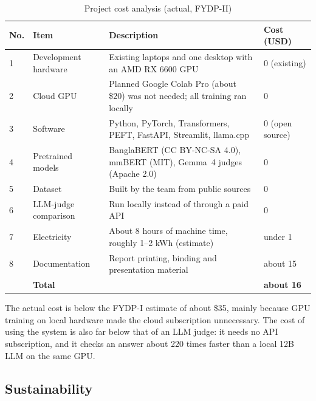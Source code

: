 \begin{table}[htbp]
\centering
\small
\caption{Project cost analysis (actual, FYDP-II)}
\label{tab:cost}
\begin{tabular}{p{0.4cm}p{3.2cm}p{5.6cm}p{2.2cm}}
\hline
\textbf{No.} & \textbf{Item} & \textbf{Description} & \textbf{Cost (USD)} \\
\hline
1 & Development hardware & Existing laptops and one desktop with an AMD RX 6600 GPU & 0 (existing) \\
2 & Cloud GPU & Planned Google Colab Pro (about \$20) was not needed; all training ran locally & 0 \\
3 & Software & Python, PyTorch, Transformers, PEFT, FastAPI, Streamlit, llama.cpp & 0 (open source) \\
4 & Pretrained models & BanglaBERT (CC BY-NC-SA 4.0), mmBERT (MIT), Gemma~4 judges (Apache 2.0) & 0 \\
5 & Dataset & Built by the team from public sources & 0 \\
6 & LLM-judge comparison & Run locally instead of through a paid API & 0 \\
7 & Electricity & About 8 hours of machine time, roughly 1--2 kWh (estimate) & under 1 \\
8 & Documentation & Report printing, binding and presentation material & about 15 \\
\hline
 & \textbf{Total} & & \textbf{about 16} \\
\hline
\end{tabular}
\end{table}

The actual cost is below the FYDP-I estimate of about \$35, mainly because GPU
training on local hardware made the cloud subscription unnecessary. The cost of
using the system is also far below that of an LLM judge: it needs no API
subscription, and it checks an answer about 220 times faster than a local 12B
LLM on the same GPU.

\subsection{Sustainability}

